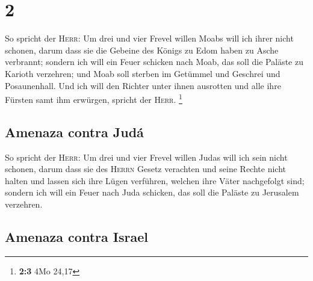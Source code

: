 \hypertarget{section-1}{%
\section{2}\label{section-1}}

 So spricht der \textsc{Herr}: Um drei und vier Frevel
willen Moabs will ich ihrer nicht schonen, darum dass sie die Gebeine
des Königs zu Edom haben zu Asche verbrannt;  sondern ich
will ein Feuer schicken nach Moab, das soll die Paläste zu Karioth
verzehren; und Moab soll sterben im Getümmel und Geschrei und
Posaunenhall.  Und ich will den Richter unter ihnen
ausrotten und alle ihre Fürsten samt ihm erwürgen, spricht der
\textsc{Herr}. \footnote{\textbf{2:3} 4Mo 24,17}

\hypertarget{amenaza-contra-juduxe1}{%
\subsection{Amenaza contra Judá}\label{amenaza-contra-juduxe1}}

 So spricht der \textsc{Herr}: Um drei und vier Frevel
willen Judas will ich sein nicht schonen, darum dass sie des
\textsc{Herrn} Gesetz verachten und seine Rechte nicht halten und lassen
sich ihre Lügen verführen, welchen ihre Väter nachgefolgt sind;
 sondern ich will ein Feuer nach Juda schicken, das soll
die Paläste zu Jerusalem verzehren.

\hypertarget{amenaza-contra-israel}{%
\subsection{Amenaza contra Israel}\label{amenaza-contra-israel}}

